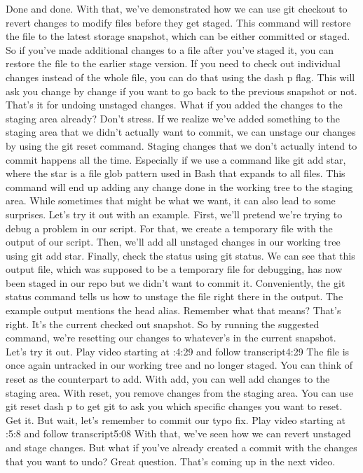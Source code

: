 	Done and done. With that, we've demonstrated how we can use git checkout to revert changes to modify files before they get staged. This command will restore the file to the latest storage snapshot, which can be either committed or staged. So if you've made additional changes to a file after you've staged it, you can restore the file to the earlier stage version. If you need to check out individual changes instead of the whole file, you can do that using the dash p flag. This will ask you change by change if you want to go back to the previous snapshot or not. That's it for undoing unstaged changes. What if you added the changes to the staging area already? Don't stress. If we realize we've added something to the staging area that we didn't actually want to commit, we can unstage our changes by using the git reset command. Staging changes that we don't actually intend to commit happens all the time. Especially if we use a command like git add star, where the star is a file glob pattern used in Bash that expands to all files. This command will end up adding any change done in the working tree to the staging area. While sometimes that might be what we want, it can also lead to some surprises. Let's try it out with an example. First, we'll pretend we're trying to debug a problem in our script. For that, we create a temporary file with the output of our script. Then, we'll add all unstaged changes in our working tree using git add star. Finally, check the status using git status. We can see that this output file, which was supposed to be a temporary file for debugging, has now been staged in our repo but we didn't want to commit it. Conveniently, the git status command tells us how to unstage the file right there in the output. The example output mentions the head alias. Remember what that means? That's right. It's the current checked out snapshot. So by running the suggested command, we're resetting our changes to whatever's in the current snapshot. Let's try it out.
	Play video starting at :4:29 and follow transcript4:29
	The file is once again untracked in our working tree and no longer staged. You can think of reset as the counterpart to add. With add, you can well add changes to the staging area. With reset, you remove changes from the staging area. You can use git reset dash p to get git to ask you which specific changes you want to reset. Get it. But wait, let's remember to commit our typo fix.
	Play video starting at :5:8 and follow transcript5:08
	With that, we've seen how we can revert unstaged and stage changes. But what if you've already created a commit with the changes that you want to undo? Great question. That's coming up in the next video.
	
